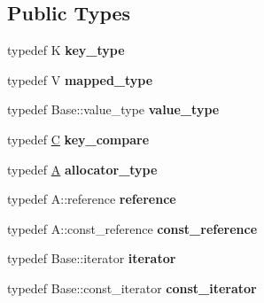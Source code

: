 \subsection*{Public Types}
\begin{DoxyCompactItemize}
\item 
\hypertarget{classLoki_1_1AssocVector_a5841e5df1baf434363254519901c5d50}{}typedef K {\bfseries key\+\_\+type}\label{classLoki_1_1AssocVector_a5841e5df1baf434363254519901c5d50}

\item 
\hypertarget{classLoki_1_1AssocVector_a293645985aa132ffa6380ff7f32c8783}{}typedef V {\bfseries mapped\+\_\+type}\label{classLoki_1_1AssocVector_a293645985aa132ffa6380ff7f32c8783}

\item 
\hypertarget{classLoki_1_1AssocVector_ae3399a43141a98556ca48631627bfb8b}{}typedef Base\+::value\+\_\+type {\bfseries value\+\_\+type}\label{classLoki_1_1AssocVector_ae3399a43141a98556ca48631627bfb8b}

\item 
\hypertarget{classLoki_1_1AssocVector_aabe67f094ede57221d255abfcfd783ad}{}typedef \hyperlink{classC}{C} {\bfseries key\+\_\+compare}\label{classLoki_1_1AssocVector_aabe67f094ede57221d255abfcfd783ad}

\item 
\hypertarget{classLoki_1_1AssocVector_a9b1fa7b1da9b857c57aa49a313529394}{}typedef \hyperlink{structA}{A} {\bfseries allocator\+\_\+type}\label{classLoki_1_1AssocVector_a9b1fa7b1da9b857c57aa49a313529394}

\item 
\hypertarget{classLoki_1_1AssocVector_a8ed82c20161b22100b90950235c4ccc2}{}typedef A\+::reference {\bfseries reference}\label{classLoki_1_1AssocVector_a8ed82c20161b22100b90950235c4ccc2}

\item 
\hypertarget{classLoki_1_1AssocVector_a6b7a274f7c586a0a24b3c7ee69a75d93}{}typedef A\+::const\+\_\+reference {\bfseries const\+\_\+reference}\label{classLoki_1_1AssocVector_a6b7a274f7c586a0a24b3c7ee69a75d93}

\item 
\hypertarget{classLoki_1_1AssocVector_aa119af1ae82779cd02264a4ae73f8cd7}{}typedef Base\+::iterator {\bfseries iterator}\label{classLoki_1_1AssocVector_aa119af1ae82779cd02264a4ae73f8cd7}

\item 
\hypertarget{classLoki_1_1AssocVector_a7ce675a855c0dcc8699353f3e8048532}{}typedef Base\+::const\+\_\+iterator {\bfseries const\+\_\+iterator}\label{classLoki_1_1AssocVector_a7ce675a855c0dcc8699353f3e8048532}


\end{DoxyCompactItemize}
